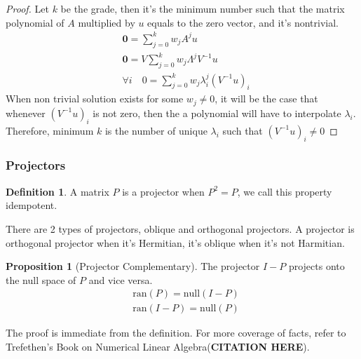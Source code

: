 \documentclass[]{article}
\theoremstyle{definition}
\newtheorem{prop}{Proposition}[section]  %
\newtheorem{definition}{Definition}
\begin{document}
            \begin{proof}
                Let $k$ be the grade, then it's the minimum number such that the matrix polynomial of $A$ multiplied by $u$ equals to the zero vector, and it's nontrivial. 
                \begin{align}
                    & \mathbf 0 = \sum_{j = 0}^{k}
                    w_jA^{j}u
                    \\
                    & \mathbf 0 = V\sum_{j = 0}^{k} w_j\Lambda^jV^{-1}u
                    \\
                    & \forall i \quad 0 = \sum_{j = 0}^{k} w_j\lambda_i^{j}(V^{-1}u)_i
                \end{align}
                When non trivial solution exists for some $w_j \neq 0$, it will be the case that whenever $(V^{-1}u)_i$ is not zero, then the a polynomial will have to interpolate $\lambda_i$. Therefore, minimum $k$ is the number of unique $\lambda_i$ such that $(V^{-1}u)_i\neq 0$
            \end{proof}
            
        \subsubsection{Projectors}
            \begin{definition}
                A matrix $P$ is a projector when $P^2 = P$, we call this property idempotent. 
            \end{definition}
            There are 2 types of projectors, oblique and orthogonal projectors. A projector is orthogonal projector when it's Hermitian, it's oblique when it's not Harmitian. 
            \begin{prop}[Projector Complementary]
                The projector $I - P$ projects onto the null space of $P$ and vice versa. 
                \begin{align}
                    & \text{ran}(P) = \text{null}(I - P)
                    \\
                    & \text{ran}(I - P) = \text{null}(P)
                \end{align}
            \end{prop}
            The proof is immediate from the definition. For more coverage of facts, refer to Trefethen's Book on Numerical Linear Algebra(\textbf{CITATION HERE}).
\end{document}
